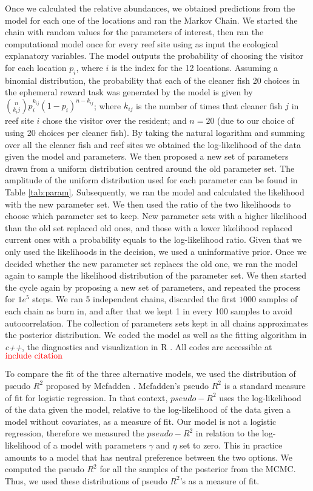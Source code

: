 \documentclass[]{rsos}%
\begin{document}
Once we calculated the relative abundances, we obtained predictions from
the model for each one of the locations and ran the Markov Chain. We started the
chain with random values for the parameters of interest, then ran the
computational model once for every reef site using as input the ecological
explanatory variables. The model outputs the probability of choosing the visitor
for each location \(p_i\), where \(i\) is the index for the 12 locations. Assuming a
binomial distribution, the probability that each of the cleaner fish 20 choices
in the ephemeral reward task was generated by the model
is given by \(\binom{n}{k_ij}p^{k_{ij}}_i (1-p_i)^{n-k_{ij}}\);
where \(k_{ij}\) is the number of times that cleaner fish \(j\) in reef site \(i\)
chose the visitor over the resident; and \(n=20\) (due to our choice of using 20
choices per cleaner fish). By taking the natural logarithm and summing over all
the cleaner fish and reef sites we obtained the log-likelihood of the data
given the model and parameters. We then proposed a new set of parameters drawn
from a uniform distribution centred around the old parameter set. The amplitude
of the uniform distribution used for each parameter can be found in Table
\ref{tab:param}. Subsequently, we ran the model and calculated the likelihood
with the new parameter set. We then used the ratio of the two likelihoods to
choose which parameter set to keep. New parameter sets with a higher likelihood
than the old set replaced old ones, and those with a lower likelihood replaced
current ones with a probability equals to the log-likelihood ratio.
Given that we only used the likelihoods in the decision, we used a
uninformative prior. Once we decided whether the new parameter set replaces
the old one, we ran the model again to sample the likelihood
distribution of the parameter set. We then started
the cycle again by proposing a new set of parameters, and repeated
the process for \(1e^5\) steps. We ran 5 independent chains,
discarded the first \(1000\) samples of each chain as burn in,
and after that we kept 1 in every 100 samples to avoid autocorrelation.
The collection of parameters sets kept in
all chains approximates the posterior distribution. We coded the model
as well as the fitting algorithm in \emph{c++}, the diagnostics and visualization
in R \citep{rcoreteam_Language_2021}. All codes are accessible at
\(\color{red}{\text{include citation}}\)

To compare the fit of the three alternative models, we used the
distribution of pseudo \(R^2\) proposed by Mcfadden \citep{mcfadden_Conditional_1974}.
Mcfadden's pseudo \(R^2\) is a standard measure of fit for logistic regression.
In that context, \(pseudo-R^2\) uses the log-likelihood of the data given
the model, relative to the log-likelihood of the data given a
model without covariates, as a measure of fit. Our
model is not a logistic regression, therefore we measured the \(pseudo-R^2\) in
relation to the log-likelihood of a model
with parameters \(\gamma\) and \(\eta\) set to zero. This in practice
amounts to a model that has neutral preference between the two options.
We computed the pseudo \(R^2\) for all the samples of the posterior from
the MCMC. Thus, we used these distributions of pseudo \(R^2\)'s as a measure of
fit.
\end{document}
